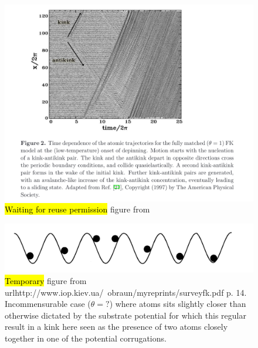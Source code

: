 \begin{figure}[H]
  \centering
  \includegraphics[width=0.8\linewidth]{figures/theory/kink_antikink.png}
  \caption{\hl{Waiting for reuse permission} figure from~\cite{Manini_2016}}
  \label{fig:kink_antikink}
\end{figure}




\begin{figure}[H]
  \centering
  \includegraphics[width=0.5\linewidth]{figures/theory/incommensurable_example.png}
  \caption{\hl{Temporary} figure from
  url{http://www.iop.kiev.ua/~obraun/myreprints/surveyfk.pdf} p. 14.
  Incommensurable case ($\theta = ?$) where atoms sits slightly closer than
  otherwise dictated by the substrate potential for which this regular result in
  a kink here seen as the presence of two atoms closely together in one of the
  potential corrugations.}
  \label{fig:incommensurable_example}
\end{figure}

